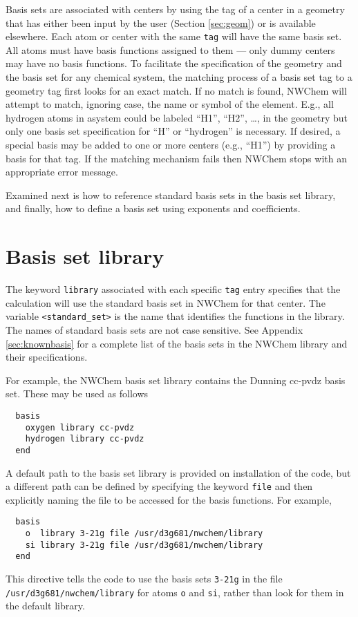 Basis sets are associated with centers by using the tag of a center in
a geometry that has either been input by the user (Section
\ref{sec:geom}) or is available elsewhere.  Each atom or center with
the same \verb+tag+ will have the same basis set.  All atoms must have
basis functions assigned to them --- only dummy centers may have no
basis functions.  To facilitate the specification of the geometry and
the basis set for any chemical system, the matching process of a basis
set tag to a geometry tag first looks for an exact match.  If no match
is found, NWChem will attempt to match, ignoring case, the name or
symbol of the element.  E.g., all hydrogen atoms in asystem could be
labeled ``H1'', ``H2'', \ldots, in the geometry but only
one basis set specification for ``H'' or ``hydrogen'' is necessary.
If desired, a special basis may be added to one or more centers (e.g.,
``H1'') by providing a basis for that tag.
If the matching mechanism fails then NWChem stops with an appropriate
error message.

Examined next is how to reference standard basis sets in the basis set
library, and finally, how to define a basis set using exponents and
coefficients.

\section{Basis set library}

The keyword \verb+library+ associated with each specific \verb+tag+
entry specifies that the calculation will use the standard basis set
in NWChem for that center.  The variable \verb+<standard_set>+ is the
name that identifies the functions in the library.  The names of
standard basis sets are not case sensitive.  See Appendix
\ref{sec:knownbasis} for a complete list of the basis sets in the
NWChem library and their specifications.  

For example, the NWChem basis set library contains the Dunning cc-pvdz
basis set.  These may be used as follows
\begin{verbatim}
  basis
    oxygen library cc-pvdz
    hydrogen library cc-pvdz
  end
\end{verbatim}

A default path to the basis set library is provided on installation of
the code, but a different path can be defined by specifying the
keyword \verb+file+ and then explicitly naming the file to be accessed
for the basis functions. For example,
\begin{verbatim}
  basis
    o  library 3-21g file /usr/d3g681/nwchem/library
    si library 3-21g file /usr/d3g681/nwchem/library
  end
\end{verbatim}
This directive tells the code to use the basis sets \verb+3-21g+ in
the file {\tt /usr/\-d3g681/\-nwchem/\-library} for atoms \verb+o+ and
\verb+si+, rather than look for them in the default library.

